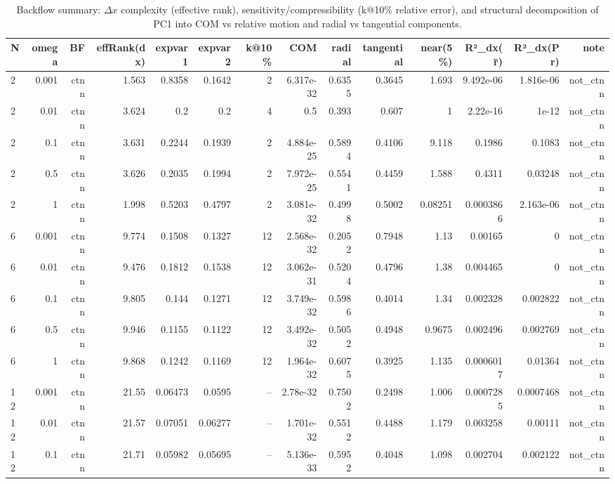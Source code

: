 \begin{table}
\caption{Backflow summary: $\Delta x$ complexity (effective rank), sensitivity/compressibility (k@10\% relative error), and structural decomposition of PC1 into COM vs relative motion and radial vs tangential components.}
\label{tab:ctnn_backflow_dx_summary}
\begin{tabular}{lrrrrrrrrrrrrr}
\toprule
N & omega & BF & effRank(dx) & expvar1 & expvar2 & k@10\% & COM & radial & tangential & near(5\%) & R²\_dx(r̄) & R²\_dx(Pr) & note \\
\midrule
2 & 0.001 & ctnn & 1.563 & 0.8358 & 0.1642 & 2 & 6.317e-32 & 0.6355 & 0.3645 & 1.693 & 9.492e-06 & 1.816e-06 & not\_ctnn \\
2 & 0.01 & ctnn & 3.624 & 0.2 & 0.2 & 4 & 0.5 & 0.393 & 0.607 & 1 & 2.22e-16 & 1e-12 & not\_ctnn \\
2 & 0.1 & ctnn & 3.631 & 0.2244 & 0.1939 & 2 & 4.884e-25 & 0.5894 & 0.4106 & 9.118 & 0.1986 & 0.1083 & not\_ctnn \\
2 & 0.5 & ctnn & 3.626 & 0.2035 & 0.1994 & 2 & 7.972e-25 & 0.5541 & 0.4459 & 1.588 & 0.4311 & 0.03248 & not\_ctnn \\
2 & 1 & ctnn & 1.998 & 0.5203 & 0.4797 & 2 & 3.081e-32 & 0.4998 & 0.5002 & 0.08251 & 0.0003866 & 2.163e-06 & not\_ctnn \\
6 & 0.001 & ctnn & 9.774 & 0.1508 & 0.1327 & 12 & 2.568e-32 & 0.2052 & 0.7948 & 1.13 & 0.00165 & 0 & not\_ctnn \\
6 & 0.01 & ctnn & 9.476 & 0.1812 & 0.1538 & 12 & 3.062e-31 & 0.5204 & 0.4796 & 1.38 & 0.004465 & 0 & not\_ctnn \\
6 & 0.1 & ctnn & 9.805 & 0.144 & 0.1271 & 12 & 3.749e-32 & 0.5986 & 0.4014 & 1.34 & 0.002328 & 0.002822 & not\_ctnn \\
6 & 0.5 & ctnn & 9.946 & 0.1155 & 0.1122 & 12 & 3.492e-32 & 0.5052 & 0.4948 & 0.9675 & 0.002496 & 0.002769 & not\_ctnn \\
6 & 1 & ctnn & 9.868 & 0.1242 & 0.1169 & 12 & 1.964e-32 & 0.6075 & 0.3925 & 1.135 & 0.0006017 & 0.01364 & not\_ctnn \\
12 & 0.001 & ctnn & 21.55 & 0.06473 & 0.0595 & -- & 2.78e-32 & 0.7502 & 0.2498 & 1.006 & 0.0007285 & 0.0007468 & not\_ctnn \\
12 & 0.01 & ctnn & 21.57 & 0.07051 & 0.06277 & -- & 1.701e-32 & 0.5512 & 0.4488 & 1.179 & 0.003258 & 0.00111 & not\_ctnn \\
12 & 0.1 & ctnn & 21.71 & 0.05982 & 0.05695 & -- & 5.136e-33 & 0.5952 & 0.4048 & 1.098 & 0.002704 & 0.002122 & not\_ctnn \\

\end{tabular}
\end{table}
